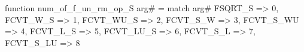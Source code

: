 function num_of_f_un_rm_op_S arg# = match arg# {
  FSQRT_S => 0,
  FCVT_W_S => 1,
  FCVT_WU_S => 2,
  FCVT_S_W => 3,
  FCVT_S_WU => 4,
  FCVT_L_S => 5,
  FCVT_LU_S => 6,
  FCVT_S_L => 7,
  FCVT_S_LU => 8
}
